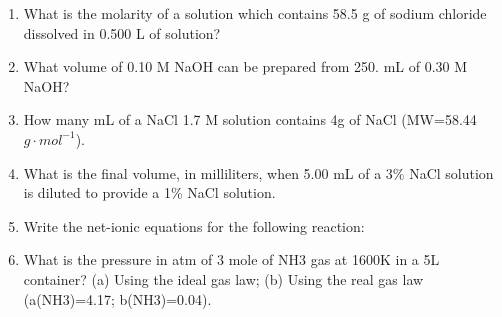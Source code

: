 \documentclass[main.tex]{subfiles}
\begin{document}
\begin{fullwidth}
\begin{multicols*}{2}
\begin{enumerate}
\item What is the molarity of a solution which contains 58.5 g of sodium chloride dissolved in 0.500 L of solution?
\begin{enumerate}[label=(\alph*)]\vspace{-0.5cm}
\end{enumerate}\vspace{-0.5cm}

\item What volume of 0.10 M NaOH can be prepared from 250. mL of 0.30 M NaOH?
\begin{enumerate}[label=(\alph*)]\vspace{-0.5cm}
\end{enumerate}\vspace{-0.5cm}



\item  How many mL of a NaCl 1.7 M solution contains 4g of NaCl (MW=58.44 $g\cdot mol^{-1}$).
\vspace{2cm}


\item What is the final volume, in milliliters, when 5.00 mL of a 3\% NaCl solution is diluted to provide a 1\%  NaCl solution.
\vspace{2cm}

\item Write the net-ionic equations for the following reaction:
\begin{center}\end{center}
\vspace{2cm}




\item What is the pressure in atm of 3 mole of NH3 gas at 1600K in a 5L container?
(a) Using the ideal gas law; (b) Using the real gas law (a(NH3)=4.17; b(NH3)=0.04).

\vspace{2cm}

    \setcounter{enumTempB}{\theenumi}
\end{enumerate}
\end{multicols*}
\end{fullwidth}
\end{document}
